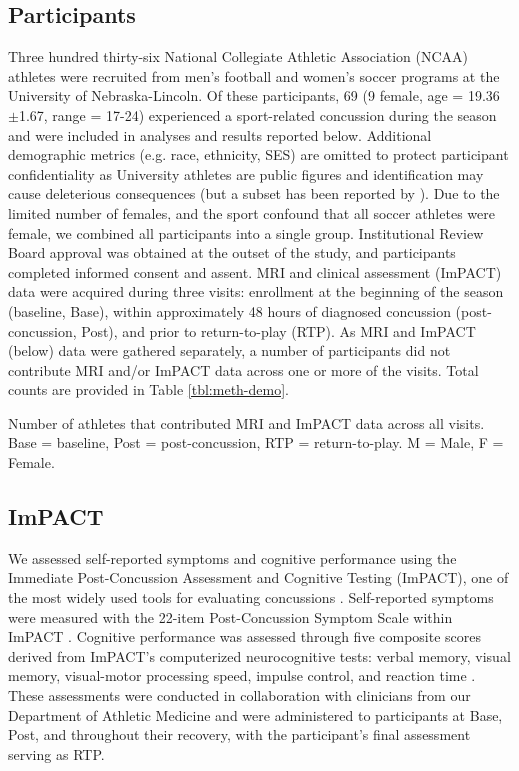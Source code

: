 \documentclass[12pt]{article}
\begin{document}
\subsection{Participants}
\label{ssec:meth-part}
Three hundred thirty-six National Collegiate Athletic Association (NCAA) athletes were recruited from men's football and women's soccer programs at the University of Nebraska-Lincoln. Of these participants, 69 (9 female, age = 19.36 $\pm$1.67, range = 17-24) experienced a sport-related concussion during the season and were included in analyses and results reported below. Additional demographic metrics (e.g. race, ethnicity, SES) are omitted to protect participant confidentiality as University athletes are public figures and identification may cause deleterious consequences (but a subset has been reported by \cite{bouchard2024ConcussionRelatedDisruptionsHub}). Due to the limited number of females, and the sport confound that all soccer athletes were female, we combined all participants into a single group. Institutional Review Board approval was obtained at the outset of the study, and participants completed informed consent and assent. MRI and clinical assessment (ImPACT) data were acquired during three visits: enrollment at the beginning of the season (baseline, Base), within approximately 48 hours of diagnosed concussion (post-concussion, Post), and prior to return-to-play (RTP). As MRI and ImPACT (below) data were gathered separately, a number of participants did not contribute MRI and/or ImPACT data across one or more of the visits. Total counts are provided in Table \ref{tbl:meth-demo}.

\begin{table}[H]
	\centering
	\scriptsize
	
	\caption{Number of athletes that contributed MRI and ImPACT data across all visits. Base = baseline, Post = post-concussion, RTP = return-to-play. M = Male, F = Female.}
	\label{tbl:meth-demo}
\end{table}


\subsection{ImPACT}
\label{ssec:meth-imp}
We assessed self-reported symptoms and cognitive performance using the Immediate Post-Concussion Assessment and Cognitive Testing (ImPACT), one of the most widely used tools for evaluating concussions \parencite{lovell2005ImPACT200540,dessy2017ReviewAssessmentScales}. Self-reported symptoms were measured with the 22-item Post-Concussion Symptom Scale within ImPACT \parencite{lovell2006MeasurementSymptomsFollowing}. Cognitive performance was assessed through five composite scores derived from ImPACT's computerized neurocognitive tests: verbal memory, visual memory, visual-motor processing speed, impulse control, and reaction time \parencite{lovell2005ImPACT200540}. These assessments were conducted in collaboration with clinicians from our Department of Athletic Medicine and were administered to participants at Base, Post, and throughout their recovery, with the participant's final assessment serving as RTP.
\end{document}
